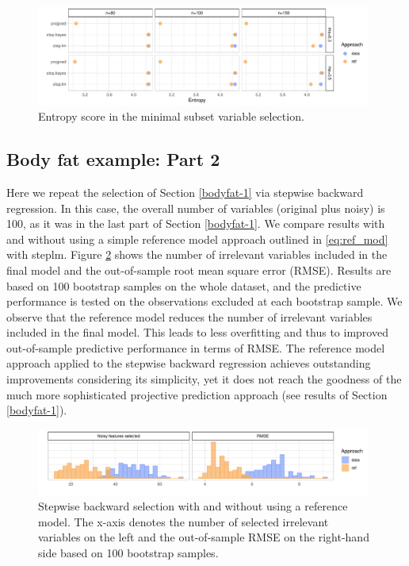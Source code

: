 \documentclass[a4]{article}
\theoremstyle{definition}
\begin{document}
\begin{figure}[tp]
  \centering
  \includegraphics[width=0.98\textwidth]{graphics/entropy_parallel.pdf}
  \caption{Entropy score in the minimal subset variable selection.}
  \label{fig:entropy}
\end{figure}


\hypertarget{bodyfat-2}{%
\subsection{Body fat example: Part 2}\label{bodyfat-2}}

Here we repeat the selection of Section \ref{bodyfat-1} via
stepwise backward regression. In this case, the overall number of
variables (original plus noisy) is 100, as it was in the last part of
Section \ref{bodyfat-1}. We compare results with and without using
a simple reference model approach outlined in \eqref{eq:ref_mod} with
steplm. Figure \ref{fig:bodyfat_step_refvsdata} shows the number of
irrelevant variables included in the final model and the out-of-sample
root mean square error (RMSE). Results are based on 100 bootstrap
samples on the whole dataset, and the predictive performance is tested
on the observations excluded at each bootstrap sample. We observe that
the reference model reduces the number of irrelevant variables included
in the final model. This leads to less overfitting and thus to
improved out-of-sample predictive performance in terms of RMSE. The
reference model approach applied to the stepwise backward regression
achieves outstanding improvements considering its simplicity, yet it
does not reach the goodness of the much more sophisticated projective
prediction approach (see results of Section \ref{bodyfat-1}).
\begin{figure}[tp]
  \centering
  \includegraphics[width=0.98\textwidth]{graphics/bodyfat_step_refvsdata.pdf}
  \caption{Stepwise backward selection with and without using a reference model. The x-axis denotes the number of selected irrelevant variables on the left and the out-of-sample RMSE on the right-hand side based on 100 bootstrap samples.\\}
  \label{fig:bodyfat_step_refvsdata}
\end{figure}
\end{document}
